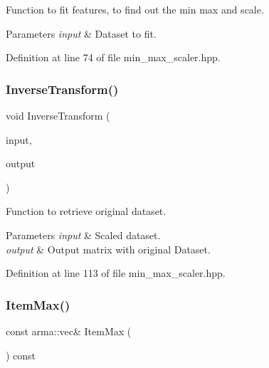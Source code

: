 Function to fit features, to find out the min max and scale. 


\begin{DoxyParams}{Parameters}
{\em input} & Dataset to fit. \\
\hline
\end{DoxyParams}


Definition at line 74 of file min\+\_\+max\+\_\+scaler.\+hpp.

\mbox{\label{classmlpack_1_1data_1_1MinMaxScaler_afb0e67c6fbf5a527f63469bbbf07066c}} 
\subsubsection{Inverse\+Transform()}
{\footnotesize\ttfamily void Inverse\+Transform (\begin{DoxyParamCaption}\item[{const Mat\+Type \&}]{input,  }\item[{Mat\+Type \&}]{output }\end{DoxyParamCaption})\hspace{0.3cm}{\ttfamily [inline]}}



Function to retrieve original dataset. 


\begin{DoxyParams}{Parameters}
{\em input} & Scaled dataset. \\
\hline
{\em output} & Output matrix with original Dataset. \\
\hline
\end{DoxyParams}


Definition at line 113 of file min\+\_\+max\+\_\+scaler.\+hpp.

\mbox{\label{classmlpack_1_1data_1_1MinMaxScaler_a5ed43c216f23cf96c432216d6fc2a1c3}} 
\subsubsection{Item\+Max()}
{\footnotesize\ttfamily const arma\+::vec\& Item\+Max (\begin{DoxyParamCaption}{ }\end{DoxyParamCaption}) const\hspace{0.3cm}{\ttfamily [inline]}}



